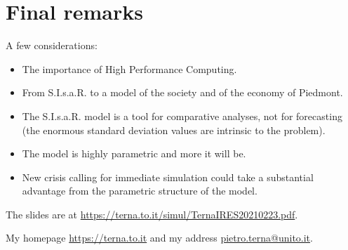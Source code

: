 \documentclass[8pt]{beamer}
\begin{document}
\section{Final remarks}

\begin{frame}{A few considerations:}

\begin{itemize}

\item
The importance of High Performance Computing.

\item
From S.I.s.a.R. to a model of the society and of the economy of Piedmont.

\bigskip

\item The S.I.s.a.R. model is a tool for comparative analyses, not for forecasting (the enormous standard deviation values are intrinsic to the problem).


\item The model is highly parametric and more it will be.

\item New crisis calling for immediate simulation could take a substantial advantage from the parametric structure of the model.

\end{itemize}

 \bigskip
 The slides are at \url{https://terna.to.it/simul/TernaIRES20210223.pdf}.
 
 My homepage \url{https://terna.to.it} and my address \url{pietro.terna@unito.it}.
 
\end{frame}
\end{document}

